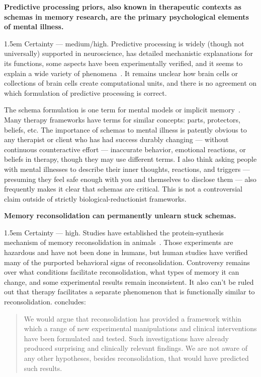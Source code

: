 \documentclass[11pt,oneside]{book}
\let\cite\parencite
\newcommand{\claim}[2]{%
    \par\medskip\noindent\textbf{#1}%
    \begin{adjustwidth}{1.5em}{}%
    \setlength{\parindent}{0pt}%
    \setlength{\parskip}{0.5\baselineskip}%
    #2%
    \end{adjustwidth}%
}
\begin{document}
\claim{Predictive processing priors, also known in therapeutic contexts as schemas in memory research, are the primary psychological elements of mental illness.}{Certainty --- medium/high. Predictive processing is widely (though not universally) supported in neuroscience, has detailed mechanistic explanations for its functions, some aspects have been experimentally verified, and it seems to explain a wide variety of phenomena~\cite{aizenbud2025neuralmechanismspredictiveprocessing,clark2015surfing,Clark_Watson_Friston_2018,eckerUnlocking}. It remains unclear how brain cells or collections of brain cells create computational units, and there is no agreement on which formulation of predictive processing is correct.

The schema formulation is one term for mental models or implicit memory~\cite{eckerUnlocking}. Many therapy frameworks have terms for similar concepts: parts, protectors, beliefs, etc. The importance of schemas to mental illness is patently obvious to any therapist or client who has had success durably changing --- without continuous counteractive effort --- inaccurate behavior, emotional reactions, or beliefs in therapy, though they may use different terms. I also think asking people with mental illnesses to describe their inner thoughts, reactions, and triggers --- presuming they feel safe enough with you and themselves to disclose them --- also frequently makes it clear that schemas are critical. This is not a controversial claim outside of strictly biological-reductionist frameworks.}
\claim{Memory reconsolidation can permanently unlearn stuck schemas.}{Certainty --- high. Studies have established the protein-synthesis mechanism of memory reconsolidation in animals~\cite{eckerUnlocking,laneReconsolidation,elsey2018human}. Those experiments are hazardous and have not been done in humans, but human studies have verified many of the purported behavioral signs of reconsolidation. Controversy remains over what conditions facilitate reconsolidation, what types of memory it can change, and some experimental results remain inconsistent. It also can't be ruled out that therapy facilitates a separate phenomenon that is functionally similar to reconsolidation. \textcite[p. 45]{elsey2018human} concludes:
\begin{quotation}
    We would argue that reconsolidation has provided a framework within which a range of new experimental manipulations and clinical interventions have been formulated and tested. Such investigations have already produced surprising and clinically relevant findings. We are not aware of any other hypotheses, besides reconsolidation, that would have predicted such results.
\end{quotation}}
\end{document}
